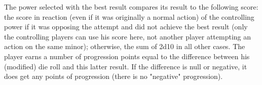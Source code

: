 The power selected with the best result compares its result to the following
score:
\bparag the score in reaction (even if it was originally a normal action) of
the controlling power if it was opposing the attempt and did not achieve the
best result (only the controlling players can use his score here, not another
player attempting an action on the same minor);
\bparag otherwise, the sum of 2d10 in all other cases.
\bparag The player earns a number of progression points equal to the
difference between his (modified) die roll and this latter result.
\bparag If the difference is null or negative, it does get any points of
progression (there is no "negative" progression).







